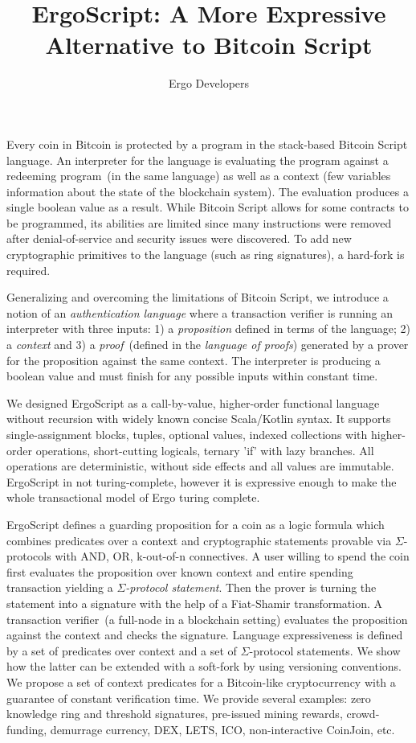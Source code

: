 \documentclass[article]{llncs}
\newcommand\TOCwithBibliography[2][plain]{%
  \begingroup
    \let\clearpage\relax
    
    
  \endgroup
  \clearpage
}
\begin{document}
\title{ErgoScript: A More Expressive Alternative to Bitcoin Script}
\author{Ergo Developers}

\maketitle

Every coin in Bitcoin is protected by a program in the stack-based Bitcoin Script
language. An interpreter for the language is evaluating the program against a redeeming
program~(in the same language) as well as a context (few variables information about
the state of the blockchain system). The evaluation produces a single boolean value as
a result. While Bitcoin Script allows for some contracts to be programmed, its
abilities are limited since many instructions were removed after denial-of-service and
security issues were discovered. To add new cryptographic primitives to the language
(such as ring signatures), a hard-fork is required.

Generalizing and overcoming the limitations of Bitcoin Script, we introduce a notion of
an \emph{authentication language} where a transaction verifier is running an
interpreter with three inputs: 1) a \textit{proposition} defined in terms of the
language; 2) a \textit{context} and 3) a \textit{proof}~(defined in the \emph{language
of proofs}) generated by a prover for the proposition against the same context. The
interpreter is producing a boolean value and must finish for any possible
inputs within constant time.

We designed ErgoScript as a call-by-value, higher-order functional language without
recursion with widely known concise Scala/Kotlin syntax. It supports single-assignment
blocks, tuples, optional values, indexed collections with higher-order operations,
short-cutting logicals, ternary 'if' with lazy branches. All
operations are deterministic, without side effects and all values are immutable.
ErgoScript in not turing-complete, however it is expressive enough to make the whole
transactional model of Ergo turing complete.

ErgoScript defines a guarding proposition for a coin as a logic formula which combines
predicates over a context and cryptographic statements provable via $\Sigma$-protocols
with AND, OR, k-out-of-n connectives. A user willing to spend the coin first evaluates
the proposition over known context and entire spending transaction yielding a
\emph{$\Sigma$-protocol statement}. Then the prover is turning the statement into a
signature with the help of a Fiat-Shamir transformation. A transaction verifier~(a
full-node in a blockchain setting) evaluates the proposition against the context and
checks the signature. Language expressiveness is defined by a set of predicates over
context and a set of $\Sigma$-protocol statements. We show how the latter can be
extended with a soft-fork by using versioning conventions. We propose a set of context
predicates for a Bitcoin-like cryptocurrency with a guarantee of constant verification
time. We provide several examples: zero knowledge ring and threshold signatures,
pre-issued mining rewards, crowd-funding, demurrage currency, DEX, LETS, ICO,
non-interactive CoinJoin, etc.

\TOCwithBibliography{sources}
\end{document}
